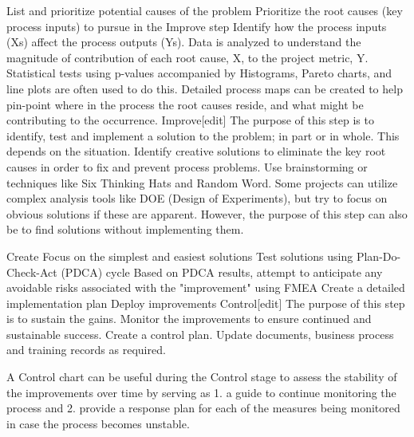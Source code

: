 List and prioritize potential causes of the problem
Prioritize the root causes (key process inputs) to pursue in the Improve step
Identify how the process inputs (Xs) affect the process outputs (Ys). Data is analyzed to understand the magnitude of contribution of each root cause, X, to the project metric, Y. Statistical tests using p-values accompanied by Histograms, Pareto charts, and line plots are often used to do this.
Detailed process maps can be created to help pin-point where in the process the root causes reside, and what might be contributing to the occurrence.
Improve[edit]
The purpose of this step is to identify, test and implement a solution to the problem; in part or in whole. This depends on the situation. Identify creative solutions to eliminate the key root causes in order to fix and prevent process problems. Use brainstorming or techniques like Six Thinking Hats and Random Word. Some projects can utilize complex analysis tools like DOE (Design of Experiments), but try to focus on obvious solutions if these are apparent. However, the purpose of this step can also be to find solutions without implementing them.

Create
Focus on the simplest and easiest solutions
Test solutions using Plan-Do-Check-Act (PDCA) cycle
Based on PDCA results, attempt to anticipate any avoidable risks associated with the "improvement" using FMEA
Create a detailed implementation plan
Deploy improvements
Control[edit]
The purpose of this step is to sustain the gains. Monitor the improvements to ensure continued and sustainable success. Create a control plan. Update documents, business process and training records as required.

A Control chart can be useful during the Control stage to assess the stability of the improvements over time by serving as 1. a guide to continue monitoring the process and 2. provide a response plan for each of the measures being monitored in case the process becomes unstable.
